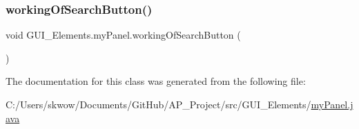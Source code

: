 \hypertarget{class_g_u_i___elements_1_1my_panel_a96d27ef92b9ddceade03b7094e0aefba}{}\label{class_g_u_i___elements_1_1my_panel_a96d27ef92b9ddceade03b7094e0aefba} 
\subsubsection{\texorpdfstring{working\+Of\+Search\+Button()}{workingOfSearchButton()}}
{\footnotesize\ttfamily void G\+U\+I\+\_\+\+Elements.\+my\+Panel.\+working\+Of\+Search\+Button (\begin{DoxyParamCaption}{ }\end{DoxyParamCaption})}



The documentation for this class was generated from the following file\+:\begin{DoxyCompactItemize}
\item 
C\+:/\+Users/skwow/\+Documents/\+Git\+Hub/\+A\+P\+\_\+\+Project/src/\+G\+U\+I\+\_\+\+Elements/\hyperlink{my_panel_8java}{my\+Panel.\+java}\end{DoxyCompactItemize}
